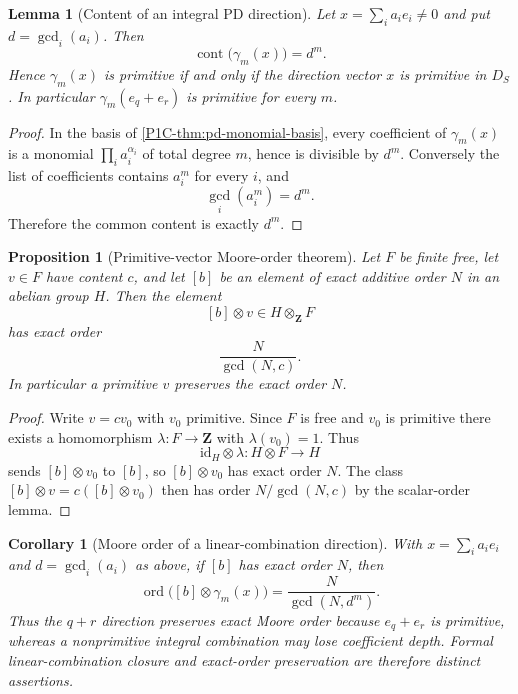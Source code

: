 \documentclass[11pt]{article}
\newtheorem{proposition}[theorem]{Proposition}
\newtheorem{lemma}[theorem]{Lemma}
\newtheorem{corollary}[theorem]{Corollary}
\theoremstyle{remark}
\newcommand{\Z}{\mathbf Z}
\providecommand{\id}{\mathrm{id}}
\begin{document}
\begin{lemma}[Content of an integral PD direction]\label{P1C-thm:pd-direction-content}
Let $x=\sum_i a_i e_i\ne0$ and put $d=\gcd_i(a_i)$. Then
\[
\boxed{\operatorname{cont}\bigl(\gamma_m(x)\bigr)=d^m.}
\]
Hence $\gamma_m(x)$ is primitive if and only if the direction vector $x$ is primitive in $D_S$. In particular $\gamma_m(e_q+e_r)$ is primitive for every $m$.
\end{lemma}

\begin{proof}
In the basis of \cref{P1C-thm:pd-monomial-basis}, every coefficient of $\gamma_m(x)$ is a monomial $\prod_i a_i^{\alpha_i}$ of total degree $m$, hence is divisible by $d^m$. Conversely the list of coefficients contains $a_i^m$ for every $i$, and
\[
\gcd_i(a_i^m)=d^m.
\]
Therefore the common content is exactly $d^m$.
\end{proof}

\begin{proposition}[Primitive-vector Moore-order theorem]\label{P1C-thm:primitive-vector-moore-order}
Let $F$ be finite free, let $v\in F$ have content $c$, and let $[b]$ be an element of exact additive order $N$ in an abelian group $H$. Then the element
\[
[b]\otimes v\in H\otimes_\Z F
\]
has exact order
\[
\boxed{\frac{N}{\gcd(N,c)}.}
\]
In particular a primitive $v$ preserves the exact order $N$.
\end{proposition}

\begin{proof}
Write $v=cv_0$ with $v_0$ primitive. Since $F$ is free and $v_0$ is primitive there exists a homomorphism $\lambda:F\to\Z$ with $\lambda(v_0)=1$. Thus
\[
\id_H\otimes\lambda:H\otimes F\to H
\]
sends $[b]\otimes v_0$ to $[b]$, so $[b]\otimes v_0$ has exact order $N$. The class $[b]\otimes v=c([b]\otimes v_0)$ then has order $N/\gcd(N,c)$ by the scalar-order lemma.
\end{proof}

\begin{corollary}[Moore order of a linear-combination direction]\label{P1C-cor:pd-linear-combination-moore-order}
With $x=\sum_i a_i e_i$ and $d=\gcd_i(a_i)$ as above, if $[b]$ has exact order $N$, then
\[
\boxed{\operatorname{ord}\bigl([b]\otimes\gamma_m(x)\bigr)=\frac{N}{\gcd(N,d^m)}.}
\]
Thus the $q+r$ direction preserves exact Moore order because $e_q+e_r$ is primitive, whereas a nonprimitive integral combination may lose coefficient depth. Formal linear-combination closure and exact-order preservation are therefore distinct assertions.
\end{corollary}
\end{document}
